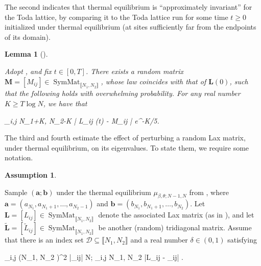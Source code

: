 \documentclass{amsart}
\numberwithin{equation}{section}
\DeclareMathOperator{\SymMat}{SymMat}
\newtheorem{lem}[thm]{Lemma}
\theoremstyle{remark}
\theoremstyle{definition}
\newtheorem{assumption}[thm]{Assumption}
\begin{document}
	The second indicates that thermal equilibrium is ``approximately invariant'' for the Toda lattice, by comparing it to the Toda lattice run for some time $t \ge 0$ initialized under thermal equilibrium (at sites sufficiently far from the endpoints of its domain).

	\begin{lem}[{\cite[Proposition 4.4]{LC}}] 
		
		\label{ltl0} 

		
		Adopt , and fix $t \in [0, T]$. There exists a random matrix $\bm{M} = [M_{ij}] \in \SymMat_{\llbracket N_1, N_2 \rrbracket}$, whose law coincides with that of $\bm{L}(0)$, such that the following holds with overwhelming probability. For any real number $K \ge T \log N $, we have that 
		\begin{flalign}
			\label{estimatelm} 
			\displaystyle\max_{i,j \in \llbracket N_1+K, N_2-K \rrbracket} | L_{ij} (t) - M_{ij} | \le e^{-K/5}.
		\end{flalign}
				
	\end{lem}
	
	The third and fourth estimate the effect of perturbing a random Lax matrix, under thermal equilibrium, on its eigenvalues. To state them, we require some notation.  
	
	\begin{assumption} 
		
		\label{lmatrixl} 
		
		Sample $(\bm{a}; \bm{b})$ under the thermal equilibrium $\mu_{\beta, \theta; N-1,N}$ from , where $\bm{a} = (a_{N_1}, a_{N_1+1}, \ldots , a_{N_2-1})$ and $\bm{b} = (b_{N_1}, b_{N_1+1}, \ldots , b_{N_2})$. Let $\bm{L} = [L_{ij}] \in \SymMat_{\llbracket N_1, N_2 \rrbracket}$ denote the associated Lax matrix (as in ), and let $\tilde{\bm{L}} = [\tilde{L}_{ij}] \in \SymMat_{\llbracket N_1, N_2 \rrbracket}$ be another (random) tridiagonal matrix. Assume that there is an index set $\mathcal{D} \subseteq \llbracket N_1, N_2 \rrbracket$ and a real number $\delta \in (0, 1)$ satisfying 
		\begin{flalign}
			\label{ll} 		
			\displaystyle\max_{i,j \notin (\llbracket N_1, N_2 \rrbracket \setminus {})^2}  |_{ij}|  \log N; \qquad \displaystyle\max_{i,j \in \llbracket N_1, N_2 \rrbracket \setminus {}} |L_{ij} - _{ij}| \le \delta.
		\end{flalign} 
		
		
	\end{assumption}
	
\end{document}
